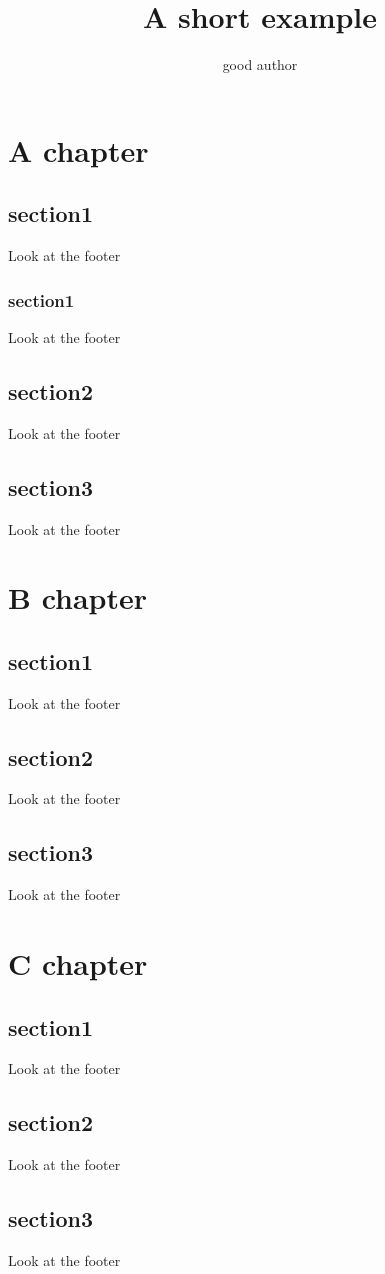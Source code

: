 \documentclass[a4paper,twoside]{report}
\title{A short example}
\author{good author}
\begin{document}
\maketitle
\tableofcontents

\pagestyle{IHA-fancy-style}
\chapter{A chapter}
\zhlipsum[1]

\newpage

\section{section1}
Look at the footer
\zhlipsum[2-6]
\subsection{section1}
Look at the footer
\zhlipsum[2-6]
\section{section2}
Look at the footer
\zhlipsum[2-6]
\section{section3}
Look at the footer
\zhlipsum[2-6]


\chapter{B chapter}
\zhlipsum[1]

\newpage

\section{section1}
Look at the footer
\zhlipsum[2-6]
\section{section2}
Look at the footer
\zhlipsum[2-6]
\section{section3}
Look at the footer
\zhlipsum[2-6]

\chapter{C chapter}
\zhlipsum[1]

\newpage

\section{section1}
Look at the footer
\zhlipsum[2-6]
\section{section2}
Look at the footer
\zhlipsum[2-6]
\section{section3}
Look at the footer
\zhlipsum[2-6]
\end{document}
